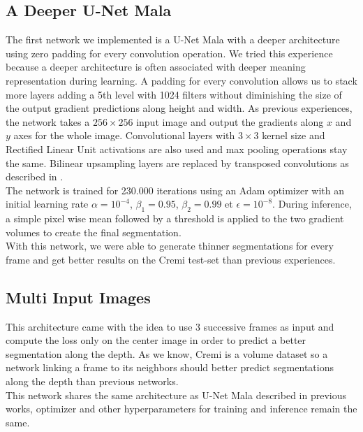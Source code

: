 \subsection{A Deeper U-Net Mala}

The first network we implemented is a U-Net Mala with a deeper architecture using zero padding for every convolution operation. We tried this experience because a deeper architecture is often associated with deeper meaning representation during learning. A padding for every convolution allows us to stack more layers adding a 5th level with 1024 filters without diminishing the size of the output gradient predictions along height and width.
As previous experiences, the network takes a $256\times256$ input image and output the gradients along $x$ and $y$ axes for the whole image. Convolutional layers with $3\times3$ kernel size and Rectified Linear Unit activations are also used and max pooling operations stay the same.
Bilinear upsampling layers are replaced by transposed convolutions as described in \cite{funke_large_2019}.\\

The network is trained for 230.000 iterations using an Adam optimizer with an initial learning rate $\alpha = 10^{-4}$, $\beta_{1}=0.95$, $\beta_{2}=0.99$ et $\epsilon=10^{-8}$. During inference,  a simple pixel wise mean followed by a threshold is applied to the two gradient volumes to create the final segmentation.\\

With this network, we were able to generate thinner segmentations for every frame and get better results on the Cremi test-set than previous experiences.


\subsection{Multi Input Images}

This architecture came with the idea to use 3 successive frames as input and compute the loss only on the center image in order to predict a better segmentation along the depth. As we know, Cremi is a volume dataset so a network linking a frame to its neighbors should better predict segmentations along the depth than previous networks.\\
This network shares the same architecture as U-Net Mala described in previous works, optimizer and other hyperparameters for training and inference remain the same.\\

